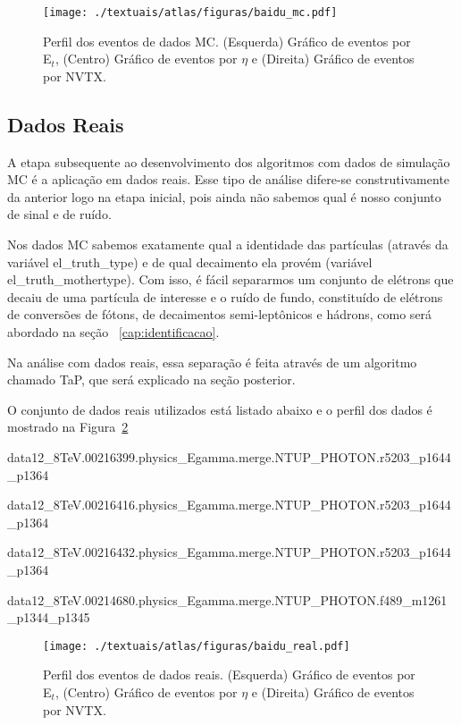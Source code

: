 \begin{figure}[H]
	\centering
	\texttt{[image: ./textuais/atlas/figuras/baidu\_mc.pdf]}\\
	\caption{Perfil dos eventos de dados MC. (Esquerda) Gráfico de eventos por E${_t}$, (Centro) Gráfico de eventos por $\eta$ e (Direita) Gráfico de eventos por NVTX.}
	\label{fig:3T20}
\end{figure}

\subsection{Dados Reais}\label{sec:real_data}

A etapa subsequente ao desenvolvimento dos algoritmos com dados de simulação MC é a aplicação em dados reais. Esse tipo de análise difere-se construtivamente da anterior logo na etapa inicial, pois ainda não sabemos qual é nosso conjunto de sinal e de ruído.
	
Nos dados MC sabemos exatamente qual a identidade das partículas (através da variável el\_truth\_type) e de qual decaimento ela provém (variável el\_truth\_mothertype). Com isso, é fácil separarmos um conjunto de elétrons que decaiu de uma partícula de interesse e o ruído de fundo, constituído de elétrons de conversões de fótons, de decaimentos semi-leptônicos e hádrons, como será abordado na seção ~\ref{cap:identificacao}.
	
Na análise com dados reais, essa separação é feita através de um algoritmo chamado \ac{TaP}, que será explicado na seção posterior.
	
O conjunto de dados reais utilizados está listado abaixo e o perfil dos dados é mostrado na Figura~\ref{fig:3T19}

data12\_8TeV.00216399.physics\_Egamma.merge.NTUP\_PHOTON.r5203\_p1644\\ \_p1364

data12\_8TeV.00216416.physics\_Egamma.merge.NTUP\_PHOTON.r5203\_p1644\\ \_p1364

data12\_8TeV.00216432.physics\_Egamma.merge.NTUP\_PHOTON.r5203\_p1644\\ \_p1364

data12\_8TeV.00214680.physics\_Egamma.merge.NTUP\_PHOTON.f489\_m1261\\ \_p1344\_p1345

\begin{figure}[H]
	\centering
	\texttt{[image: ./textuais/atlas/figuras/baidu\_real.pdf]}\\
	\caption{Perfil dos eventos de dados reais. (Esquerda) Gráfico de eventos por E${_t}$, (Centro) Gráfico de eventos por $\eta$ e (Direita) Gráfico de eventos por NVTX.}
	\label{fig:3T19}
\end{figure}

